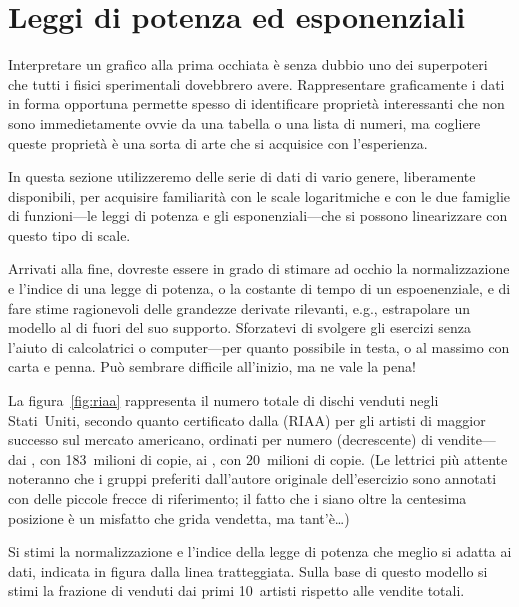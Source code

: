\chapter{Leggi di potenza ed esponenziali}

Interpretare un grafico alla prima occhiata \`e senza dubbio uno dei superpoteri
che tutti i fisici sperimentali dovebbrero avere. Rappresentare graficamente i
dati in forma opportuna permette spesso di identificare propriet\`a interessanti
che non sono immedietamente ovvie da una tabella o una lista di numeri, ma cogliere
queste propriet\`a \`e una sorta di arte che si acquisice con l'esperienza.

In questa sezione utilizzeremo delle serie di dati di vario genere, liberamente
disponibili, per acquisire familiarit\`a con le scale logaritmiche e con le
due famiglie di funzioni---le leggi di potenza e gli esponenziali---che si possono
linearizzare con questo tipo di scale.

Arrivati alla fine, dovreste essere in grado di stimare ad occhio la normalizzazione
e l'indice di una legge di potenza, o la costante di tempo di un espoenenziale,
e di fare stime ragionevoli delle grandezze derivate rilevanti, e.g., estrapolare
un modello al di fuori del suo supporto. Sforzatevi di svolgere gli esercizi
senza l'aiuto di calcolatrici o computer---per quanto possibile in testa, o al
massimo con carta e penna. Pu\`o sembrare difficile all'inizio, ma ne vale la pena!


\begin{exercise}

La figura~\ref{fig:riaa} rappresenta il numero totale di dischi venduti negli Stati~Uniti,
secondo quanto certificato dalla 
(RIAA) per gli artisti di maggior successo sul mercato americano, ordinati per
numero (decrescente) di vendite---dai , con 183~milioni di copie,
ai , con 20~milioni di copie. (Le lettrici più attente noteranno
che i gruppi preferiti dall'autore originale dell'esercizio sono annotati con
delle piccole frecce di riferimento; il fatto che i  siano
oltre la centesima posizione è un misfatto che grida vendetta, ma tant'è\ldots)


Si stimi la normalizzazione e l'indice della legge di potenza che meglio si adatta
ai dati, indicata in figura dalla linea tratteggiata. Sulla base di questo modello
si stimi la frazione di  venduti dai primi 10~artisti rispetto alle
vendite totali.

\end{exercise}


